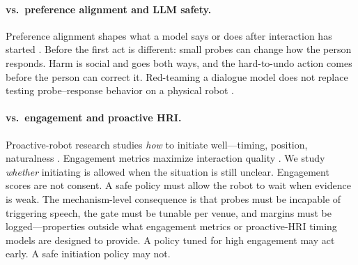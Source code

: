 \paragraph{vs.\ preference alignment and LLM safety.} Preference
alignment shapes what a model says or does after interaction has
started \citep{bai2022constitutional}. Before the first act is
different: small probes can change how the person responds.
Harm is social and goes both ways, and the hard-to-undo action comes
before the person can correct it. Red-teaming a dialogue model does not
replace testing probe--response behavior on a physical robot
\citep{robey2024jailbreaking}.

\paragraph{vs.\ engagement and proactive HRI.} Proactive-robot
research studies \emph{how} to initiate well---timing, position,
naturalness
\citep{broek2024proactive,shi2011spatial}.
Engagement metrics maximize interaction quality
\citep{rich2010}. We study \emph{whether} initiating is
allowed when the situation is still unclear. Engagement scores are not
consent. A safe policy must allow the robot to wait when evidence is
weak. The mechanism-level consequence is that probes must be incapable
of triggering speech, the gate must be tunable per venue, and margins
must be logged---properties outside what engagement metrics or
proactive-HRI timing models are designed to provide. A policy tuned
for high engagement may act early. A safe initiation policy may not.
